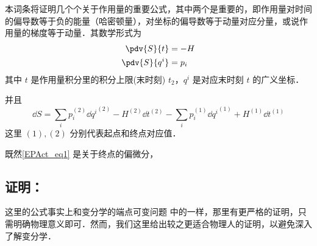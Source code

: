 本词条将证明几个个关于作用量的重要公式，其中两个是重要的，即作用量对时间的偏导数等于负的能量（哈密顿量），对坐标的偏导数等于动量对应分量，或说作用量的梯度等于动量．其数学形式为
\begin{equation}\label{EPAct_eq1}
\begin{aligned}
\pdv{S}{t}&=-H\\
\pdv{S}{q^i}&=p_i
\end{aligned}
\end{equation}
其中 $t$ 是作用量积分里的积分上限(末时刻) $t_2$，$q^i$ 是对应末时刻 $t$ 的广义坐标．

并且
\begin{equation}\label{EPAct_eq2}
\dd S=\sum_i p_i^{(2)}\dd {q^i}^{(2)}-H^{(2)}\dd t^{(2)}-\sum_i p_i^{(1)}\dd {q^i}^{(1)}+H^{(1)}\dd t^{(1)}
\end{equation}
这里 $(1),(2)$ 分别代表起点和终点对应值．

既然\autoref{EPAct_eq1} 是关于终点的偏微分，
\subsection{证明：}
这里的公式事实上和变分学的端点可变问题 中的一样，那里有更严格的证明，只需明确物理意义即可．然而，我们这里给出较之更适合物理人的证明，以避免深入了解变分学．

